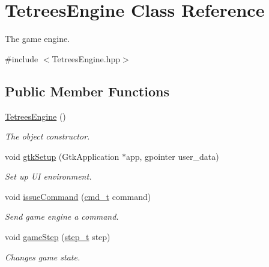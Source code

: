 \hypertarget{classTetreesEngine}{}\section{Tetrees\+Engine Class Reference}
\label{classTetreesEngine}


The game engine.  




{\ttfamily \#include $<$Tetrees\+Engine.\+hpp$>$}

\subsection*{Public Member Functions}
\begin{DoxyCompactItemize}
\item 
\mbox{\label{classTetreesEngine_ada1775237223604c895a50625eda1d49}} 
\hyperlink{classTetreesEngine_ada1775237223604c895a50625eda1d49}{Tetrees\+Engine} ()
\begin{DoxyCompactList}\small\item\em The object constructor. \end{DoxyCompactList}\item 
void \hyperlink{classTetreesEngine_a85e0da200fb3e17745f1978d24acca2f}{gtk\+Setup} (Gtk\+Application $\ast$app, gpointer user\+\_\+data)
\begin{DoxyCompactList}\small\item\em Set up UI environment. \end{DoxyCompactList}\item 
\mbox{\label{classTetreesEngine_aa2a283d09b0b6ab7c03ea2265a2e3438}} 
void \hyperlink{classTetreesEngine_aa2a283d09b0b6ab7c03ea2265a2e3438}{issue\+Command} (\hyperlink{TetreesDefs_8hpp_aadc337e2620d6621659e63e87c45e79d}{cmd\+\_\+t} command)
\begin{DoxyCompactList}\small\item\em Send game engine a command. \end{DoxyCompactList}\item 
void \hyperlink{classTetreesEngine_a33e9983a618b3538640b6bd987304b8b}{game\+Step} (\hyperlink{TetreesDefs_8hpp_a4d5a793092a473f85b4c1f7faf62afed}{step\+\_\+t} step)
\begin{DoxyCompactList}\small\item\em Changes game state. \end{DoxyCompactList}\item 

\end{DoxyCompactItemize}

